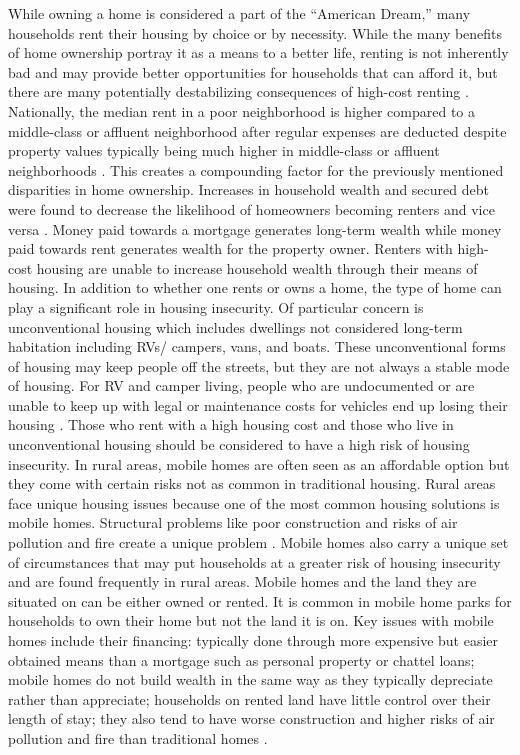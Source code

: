 While owning a home is considered a part of the “American Dream,” many households rent their housing by choice or by necessity. While the many benefits of home ownership portray it as a means to a better life, renting is not inherently bad and may provide better opportunities for households that can afford it, but there are many potentially destabilizing consequences of high-cost renting \citep{drew_believing_2014}. Nationally, the median rent in a poor neighborhood is higher compared to a middle-class or affluent neighborhood after regular expenses are deducted despite property values typically being much higher in middle-class or affluent neighborhoods \citep{desmond_poor_2019}. This creates a compounding factor for the previously mentioned disparities in home ownership. Increases in household wealth and secured debt were found to decrease the likelihood of homeowners becoming renters and vice versa \citep{anderson_effect_2021}. Money paid towards a mortgage generates long-term wealth while money paid towards rent generates wealth for the property owner. Renters with high-cost housing are unable to increase household wealth through their means of housing.  In addition to whether one rents or owns a home, the type of home can play a significant role in housing insecurity. Of particular concern is unconventional housing which includes dwellings not considered long-term habitation including RVs/ campers, vans, and boats. These unconventional forms of housing may keep people off the streets, but they are not always a stable mode of housing. For RV and camper living, people who are undocumented or are unable to keep up with legal or maintenance costs for vehicles end up losing their housing \citep{wakin_not_2005}. Those who rent with a high housing cost and those who live in unconventional housing should be considered to have a high risk of housing insecurity. In rural areas, mobile homes are often seen as an affordable option but they come with certain risks not as common in traditional housing. Rural areas face unique housing issues because one of the most common housing solutions is mobile homes. Structural problems like poor construction and risks of air pollution and fire create a unique problem \citep{mactavish_policy_2006}. Mobile homes also carry a unique set of circumstances that may put households at a greater risk of housing insecurity and are found frequently in rural areas. Mobile homes and the land they are situated on can be either owned or rented. It is common in mobile home parks for households to own their home but not the land it is on. Key issues with mobile homes include their financing: typically done through more expensive but easier obtained means than a mortgage such as personal property or chattel loans; mobile homes do not build wealth in the same way as they typically depreciate rather than appreciate; households on rented land have little control over their length of stay; they also tend to have worse construction and higher risks of air pollution and fire than traditional homes \citep{mactavish_wrong_2007}. 


